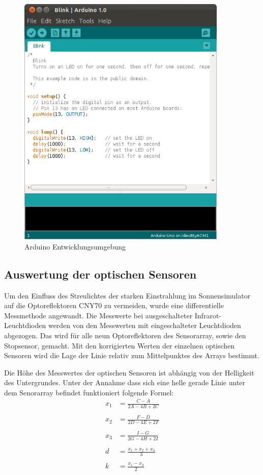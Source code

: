 \documentclass[a4paper,bibtotoc,oneside]{scrbook}
\begin{document}
\begin{figure}[htbp]
\centering
\includegraphics[width=100mm]{img/Arduino.png}
\caption[Die Arduino Entwicklungsumgebung]{Arduino Entwicklungsumgebung}\label{ardu2}
\end{figure}

\subsection{Auswertung der optischen Sensoren}\thispagestyle{empty}
Um den Einfluss des Streulichtes der starken Einstrahlung im Sonnensimulator auf die Optoreflektoren CNY70 zu vermeiden, wurde eine differentielle Messmethode angewandt. Die Messwerte bei ausgeschalteter Infrarot-Leuchtdioden werden von den Messwerten mit eingeschalteter Leuchtdioden abgezogen.
Das wird für alle neun Optoreflektoren des Sensorarray, sowie den Stopsensor, gemacht.
Mit den korrigierten Werten der einzelnen optischen Sensoren wird die Lage der Linie relativ zum Mittelpunktes des Arrays bestimmt. 

Die Höhe des Messwertes  der optischen Sensoren ist abhängig von der Helligkeit des Untergrundes. Unter der Annahme dass sich eine helle gerade Linie unter dem Senorarray befindet funktioniert folgende Formel:
\begin{align*}
  x_1 &= \frac{C-A}{2A-4B+2C} \\
  \\
  x_2 &=  \frac{F-D}{2D-4E+2F} \\
  \\
  x_3 &=  \frac{I-G}{2G-4H+2I} \\
  \\
  d &=  \frac{x_1+x_2+x_3}{3} \\
  \\
  k &=  \frac{x_1-x_3}{2}
\end{align*}
\end{document}
